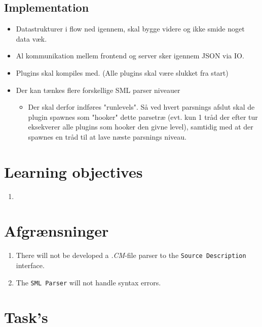 \documentclass[a4paper,oneside]{memoir}
\begin{document}
\subsection{Implementation}


\begin{itemize}
\item Datastrukturer i flow ned igennem, skal bygge videre og ikke smide noget
  data væk.

\item Al kommunikation mellem frontend og server sker igennem JSON via IO.

\item Plugins skal kompiles med. (Alle plugins skal være slukket fra start)


\item Der kan tænkes flere forskellige SML parser niveauer 
  \begin{itemize}

  \item Der skal derfor indføres "runlevels". Så ved hvert parsnings afslut skal
    de plugin spawnes som "hooker" dette parsetræ (evt. kun 1 tråd der efter tur
    eksekverer alle plugins som hooker den givne level), samtidig med at der
    spawnes en tråd til at lave næste parsnings niveau.
  \end{itemize}
\end{itemize}

\section{Learning objectives}

\begin{enumerate}
\item 
\end{enumerate}

\section{Afgrænsninger}


\begin{enumerate}
\item There will not be developed a \textit{.CM}-file parser to the
  \texttt{Source Description} interface.

\item The \texttt{SML Parser} will not handle syntax errors. 
\end{enumerate}


\section{Task's}
\end{document}
